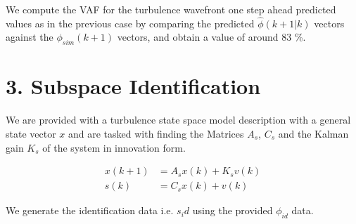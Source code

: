 \documentclass[12pt]{report}
\begin{document}
We compute the VAF for the turbulence wavefront one step ahead predicted values as in the previous case by comparing the predicted $\hat\phi(k+1|k)$ vectors against the $\phi_{sim}(k+1)$ vectors, and obtain a value of around 83 \%.

\section*{3. Subspace Identification}

We are provided with a turbulence state space model description with a general state vector $x$ and are tasked with finding the Matrices $A_s$, $C_s$ and the Kalman gain $K_s$ of the system in innovation form.

\begin{equation}
\begin{aligned}
x(k+1) &= A_s x(k) + K_s v(k)\\
s(k) &= C_s x(k) + v(k)
\end{aligned}
\end{equation}

We generate the identification data i.e. $s_id$ using the provided $\phi_{id}$ data.
\end{document}
